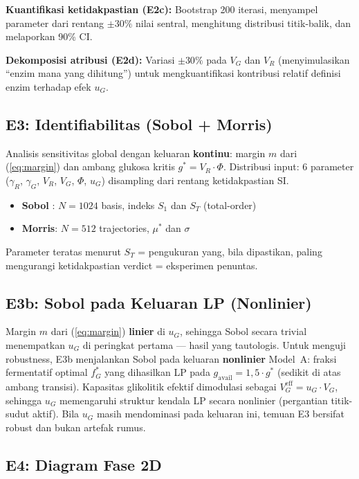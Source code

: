 \textbf{Kuantifikasi ketidakpastian (E2c):} Bootstrap 200 iterasi,
menyampel parameter dari rentang $\pm 30\%$ nilai sentral, menghitung
distribusi titik-balik, dan melaporkan 90\% CI.

\textbf{Dekomposisi atribusi (E2d):} Variasi $\pm 30\%$ pada $V_G$ dan
$V_R$ (menyimulasikan ``enzim mana yang dihitung'') untuk mengkuantifikasi
kontribusi relatif definisi enzim terhadap efek $u_G$.

\subsection{E3: Identifiabilitas (Sobol + Morris)}

Analisis sensitivitas global dengan keluaran \textbf{kontinu}: margin $m$
dari (\ref{eq:margin}) dan ambang glukosa kritis $g^* = V_R \cdot \Phi$.
Distribusi input: 6 parameter ($\gamma_R$, $\gamma_G$, $V_R$, $V_G$,
$\Phi$, $u_G$) disampling dari rentang ketidakpastian SI.

\begin{itemize}
    \item \textbf{Sobol} \cite{salib}: $N=1024$ basis, indeks $S_1$ dan $S_T$ (total-order)
    \item \textbf{Morris}: $N=512$ trajectories, $\mu^*$ dan $\sigma$
\end{itemize}

Parameter teratas menurut $S_T$ = pengukuran yang, bila dipastikan,
paling mengurangi ketidakpastian verdict = eksperimen penuntas.

\subsection{E3b: Sobol pada Keluaran LP (Nonlinier)}

Margin $m$ dari (\ref{eq:margin}) \textbf{linier} di $u_G$, sehingga
Sobol secara trivial menempatkan $u_G$ di peringkat pertama --- hasil
yang tautologis. Untuk menguji robustness, E3b menjalankan Sobol pada
keluaran \textbf{nonlinier} Model~A: fraksi fermentatif optimal
$f^*_G$ yang dihasilkan LP pada $g_\text{avail} = 1{,}5 \cdot g^*$
(sedikit di atas ambang transisi). Kapasitas glikolitik efektif
dimodulasi sebagai $V_G^\text{eff} = u_G \cdot V_G$, sehingga $u_G$
memengaruhi struktur kendala LP secara nonlinier (pergantian titik-sudut
aktif). Bila $u_G$ masih mendominasi pada keluaran ini, temuan E3
bersifat robust dan bukan artefak rumus.

\subsection{E4: Diagram Fase 2D}

